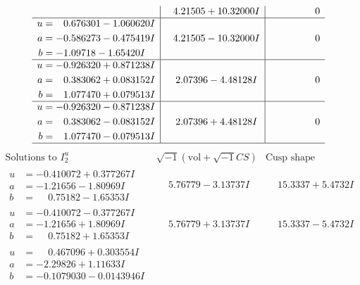 \documentclass[1p]{elsarticle_modified}
\theoremstyle{definition}
\newcommand{\I}{\sqrt{-1}}
\begin{document}
$$\begin{array}{c|c|c}
 & \phantom{-}4.21505 + 10.32000 I & \phantom{-0.000000 } 0 \\ \hline\begin{aligned}
u &= \phantom{-}0.676301 - 1.060620 I \\
a &= -0.586273 - 0.475419 I \\
b &= -1.09718 - 1.65420 I\end{aligned}
 & \phantom{-}4.21505 - 10.32000 I & \phantom{-0.000000 } 0 \\ \hline\begin{aligned}
u &= -0.926320 + 0.871238 I \\
a &= \phantom{-}0.383062 + 0.083152 I \\
b &= \phantom{-}1.077470 + 0.079513 I\end{aligned}
 & \phantom{-}2.07396 - 4.48128 I & \phantom{-0.000000 } 0 \\ \hline\begin{aligned}
u &= -0.926320 - 0.871238 I \\
a &= \phantom{-}0.383062 - 0.083152 I \\
b &= \phantom{-}1.077470 - 0.079513 I\end{aligned}
 & \phantom{-}2.07396 + 4.48128 I & \phantom{-0.000000 } 0\\
 \hline 
 \end{array}$$\newpage$$\begin{array}{c|c|c}  
\text{Solutions to }I^u_{2}& \I (\text{vol} + \sqrt{-1}CS) & \text{Cusp shape}\\
 \hline 
\begin{aligned}
u &= -0.410072 + 0.377267 I \\
a &= -1.21656 - 1.80969 I \\
b &= \phantom{-}0.75182 - 1.65353 I\end{aligned}
 & \phantom{-}5.76779 - 3.13737 I & \phantom{-}15.3337 + 5.4732 I \\ \hline\begin{aligned}
u &= -0.410072 - 0.377267 I \\
a &= -1.21656 + 1.80969 I \\
b &= \phantom{-}0.75182 + 1.65353 I\end{aligned}
 & \phantom{-}5.76779 + 3.13737 I & \phantom{-}15.3337 - 5.4732 I \\ \hline\begin{aligned}
u &= \phantom{-}0.467096 + 0.303554 I \\
a &= -2.29826 + 1.11633 I \\
b &= -0.1079030 - 0.0143946 I\end{aligned}

\end{array}$$
\end{document}
